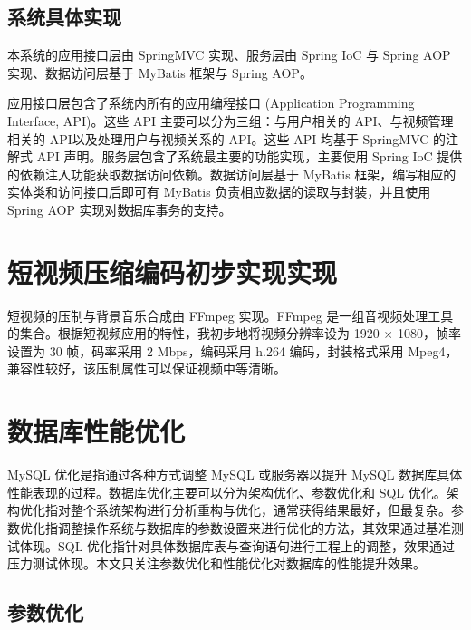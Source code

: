 \subsection{系统具体实现}
本系统的应用接口层由 SpringMVC 实现、服务层由 Spring IoC 与 Spring AOP 实现、数据访问层基于 MyBatis 框架与 Spring AOP。

应用接口层包含了系统内所有的应用编程接口 (Application Programming Interface, API)。这些 API 主要可以分为三组：与用户相关的 API、与视频管理相关的 API以及处理用户与视频关系的 API。这些 API 均基于 SpringMVC 的注解式 API 声明。服务层包含了系统最主要的功能实现，主要使用 Spring IoC 提供的依赖注入功能获取数据访问依赖。数据访问层基于 MyBatis 框架，编写相应的实体类和访问接口后即可有 MyBatis 负责相应数据的读取与封装，并且使用 Spring AOP 实现对数据库事务的支持。



\section{短视频压缩编码初步实现实现}

短视频的压制与背景音乐合成由 FFmpeg\cite{ffmpeg2019} 实现。FFmpeg 是一组音视频处理工具的集合。根据短视频应用的特性，我初步地将视频分辨率设为 1920 $\times$ 1080，帧率设置为 30 帧，码率采用 2 Mbps，编码采用 h.264 编码，封装格式采用 Mpeg4，兼容性较好，该压制属性可以保证视频中等清晰。




\section{数据库性能优化}

MySQL 优化是指通过各种方式调整 MySQL 或服务器以提升 MySQL 数据库具体性能表现的过程。数据库优化主要可以分为架构优化、参数优化和 SQL 优化。架构优化指对整个系统架构进行分析重构与优化，通常获得结果最好，但最复杂。参数优化指调整操作系统与数据库的参数设置来进行优化的方法，其效果通过基准测试体现。SQL 优化指针对具体数据库表与查询语句进行工程上的调整，效果通过压力测试体现。本文只关注参数优化和性能优化对数据库的性能提升效果。

\subsection{参数优化}

